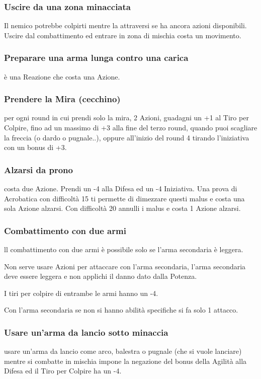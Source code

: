 \documentclass[a4paper,11pt,twoside,openany]{book}
\begin{document}
\subsubsection{Uscire da una zona minacciata} Il nemico potrebbe colpirti mentre la attraversi se ha ancora azioni disponibili. Uscire dal combattimento ed entrare in zona di mischia costa un movimento.

\subsubsection{Preparare una arma lunga contro una carica} è una Reazione che costa una Azione.

\subsubsection{Prendere la Mira (cecchino)} per ogni round in cui prendi solo la mira, 2 Azioni, guadagni un +1 al Tiro per Colpire, fino ad un massimo di +3 alla fine del terzo round, quando puoi scagliare la freccia (o dardo o pugnale..), oppure all'inizio del round 4 tirando l'iniziativa con un bonus di +3.

\subsubsection{Alzarsi da prono} costa due Azione. Prendi un -4 alla Difesa ed un -4 Iniziativa. Una prova di Acrobatica con difficoltà 15 ti permette di dimezzare questi malus e costa una sola Azione alzarsi. Con difficoltà 20 annulli i malus e costa 1 Azione alzarsi.
	
\subsubsection{Combattimento con due armi} ll combattimento con due armi è possibile solo se l'arma secondaria è leggera.

Non serve usare Azioni per attaccare con l'arma secondaria, l'arma secondaria deve essere leggera e non applichi il danno dato dalla Potenza.

I tiri per colpire di entrambe le armi hanno un -4.

Con l'arma secondaria se non si hanno abilità specifiche si fa solo 1 attacco.

\subsubsection{Usare un'arma da lancio sotto minaccia} usare un'arma da lancio come arco, balestra o pugnale (che si vuole lanciare) mentre si combatte in mischia impone la negazione del bonus della Agilità alla Difesa ed il Tiro per Colpire ha un -4.
\end{document}
